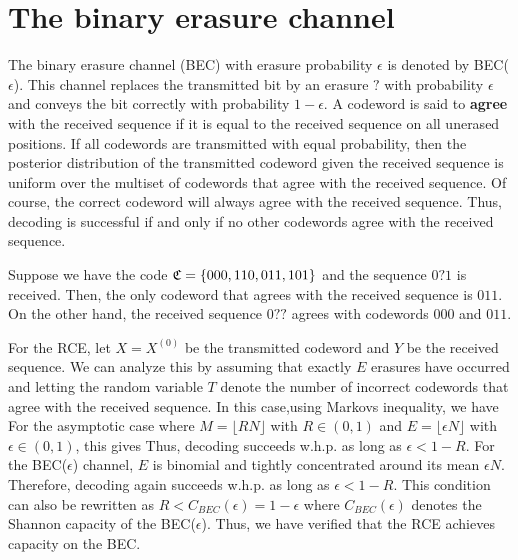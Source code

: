 \documentclass[letterpaper,english,10pt]{article}
\begin{document}
\section{The binary erasure channel}
The binary erasure channel (BEC) with erasure probability $\epsilon$ is denoted by BEC($\epsilon$).  
This channel replaces the transmitted bit by an erasure $?$ with probability $\epsilon$  and conveys the bit correctly with probability $1-\epsilon$. 
A codeword is said to \textbf{agree} with the received sequence if it is equal to the received sequence on all unerased positions. 
If all codewords are transmitted with equal probability, then the posterior distribution of the transmitted codeword given the received sequence is uniform over the multiset of codewords that agree with the received sequence. 
Of course, the correct codeword will always agree with the received sequence. 
Thus, decoding is successful if and only if no other codewords agree with the received sequence. 
\begin{shaded*}
\begin{exmp}
Suppose we have the code $\mathfrak{C} = \left\{000, 110, 011, 101\right\}$ and the sequence $0?1$ is received. 
Then, the only codeword that agrees with the received sequence is $011$. 
On the other hand, the received sequence $0??$ agrees with codewords $000$ and $011$. 
\end{exmp}
\end{shaded*}
For the RCE, let  $X = X^{(0)}$ be the transmitted codeword and $Y$ be the received sequence. 
We can analyze this by assuming that exactly $E$ erasures have occurred and letting the random variable  $T$ denote the number of incorrect codewords that agree with the received sequence. 
In this case,using Markovs inequality, we have 
For the asymptotic case where $M = \lfloor RN\rfloor$ with $R \in (0,1)$ and $E = \lfloor \epsilon N\rfloor$ with $\epsilon \in (0,1)$, this gives
Thus, decoding succeeds w.h.p. as long as $\epsilon < 1 - R$. 
For the BEC($\epsilon$) channel, $E$ is binomial and tightly concentrated around its mean $\epsilon N$. 
Therefore, decoding again succeeds w.h.p. as long as $\epsilon < 1 - R$. 
This condition can also be rewritten as $R < C_{BEC}(\epsilon) = 1 - \epsilon$ where $C_{BEC}(\epsilon)$ denotes the Shannon capacity of the BEC($\epsilon$). 
Thus, we have verified that the RCE achieves capacity on the BEC. 
\end{document}
